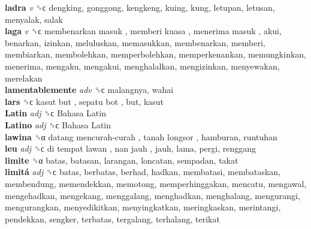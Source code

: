 \textbf{ladra} \emph{v}  ␝ϲ  dengking, gonggong, kengkeng, kuing, kung, letupan, letusan, menyalak, salak  \\
\textbf{laga} \emph{v}  ␝ϲ   membenarkan masuk ,  memberi kuasa ,  menerima masuk , akui, benarkan, izinkan, meluluskan, memasukkan, membenarkan, memberi, membiarkan, membolehkan, memperbolehkan, memperkenankan, memungkinkan, menerima, mengaku, mengakui, menghalalkan, mengizinkan, menyewakan, merelakan  \\
\textbf{lamentablemente} \emph{adv}  ␝ϲ  malangnya, wahai  \\
\textbf{lars} ␝ϲ   kasut but ,  sepatu bot , but, kasut  \\
\textbf{Latin} \emph{adj}  ␝ϲ   Bahasa Latin   \\
\textbf{Latino} \emph{adj}  ␝ϲ   Bahasa Latin   \\
\textbf{lawina} ␝α   datang mencurah-curah ,  tanah longsor , hamburan, runtuhan  \\
\textbf{leu} \emph{adj}  ␝ϲ   di tempat lawan ,  nan jauh , jauh, lama, pergi, renggang  \\
\textbf{limite} ␝α  batas, batasan, larangan, loncatan, sempadan, takat  \\
\textbf{limitá} \emph{adj}  ␝ϲ  batas, berbatas, berhad, hadkan, membatasi, membataskan, membendung, memendekkan, memotong, memperhinggakan, mencatu, mengawal, mengehadkan, mengekang, menggalang, menghadkan, menghalang, mengurangi, mengurangkan, menyedikitkan, menyingkatkan, meringkaskan, merintangi, pendekkan, sengker, terbatas, tergalang, terhalang, terikat  \\
